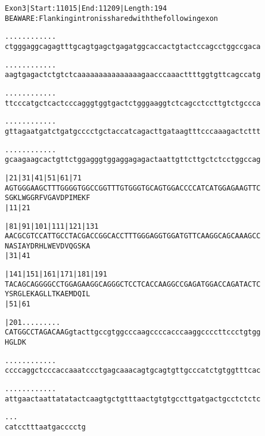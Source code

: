 \documentclass{article}
\begin{document}
\newpage
\begin{alltt}
Exon 3 | Start: 11015 | End: 11209 | Length: 194
BE AWARE: Flanking intron is shared with the following exon

.    .    .    .    .    .    .    .    .    .    .    .    
ctgggaggcagagtttgcagtgagctgagatggcaccactgtactccagcctggccgaca

.    .    .    .    .    .    .    .    .    .    .    .    
aagtgagactctgtctcaaaaaaaaaaaaaaagaacccaaacttttggtgttcagccatg

.    .    .    .    .    .    .    .    .    .    .    .    
ttcccatgctcactcccagggtggtgactctgggaaggtctcagcctccttgtctgccca

.    .    .    .    .    .    .    .    .    .    .    .    
gttagaatgatctgatgcccctgctaccatcagacttgataagtttcccaaagactcttt

.    .    .    .    .    .    .    .    .    .    .    .    
gcaagaagcactgttctggagggtggaggagagactaattgttcttgctctcctggccag

        |21       |31       |41       |51       |61       |71
AGTGGGAAGCTTTGGGGTGGCCGGTTTGTGGGTGCAGTGGACCCCATCATGGAGAAGTTC
S  G  K  L  W  G  G  R  F  V  G  A  V  D  P  I  M  E  K  F  
                  |11                           |21         

        |81       |91       |101      |111      |121      |131
AACGCGTCCATTGCCTACGACCGGCACCTTTGGGAGGTGGATGTTCAAGGCAGCAAAGCC
N  A  S  I  A  Y  D  R  H  L  W  E  V  D  V  Q  G  S  K  A  
                  |31                           |41         

        |141      |151      |161      |171      |181      |191
TACAGCAGGGGCCTGGAGAAGGCAGGGCTCCTCACCAAGGCCGAGATGGACCAGATACTC
Y  S  R  G  L  E  K  A  G  L  L  T  K  A  E  M  D  Q  I  L  
                  |51                           |61         

        |201       .    .    .    .    .    .    .    .    .
CATGGCCTAGACAAGgtacttgccgtggcccaagccccacccaaggccccttccctgtgg
H  G  L  D  K                                               

    .    .    .    .    .    .    .    .    .    .    .    .
ccccaggctcccaccaaatccctgagcaaacagtgcagtgttgcccatctgtggtttcac

    .    .    .    .    .    .    .    .    .    .    .    .
attgaactaattatatactcaagtgctgtttaactgtgtgccttgatgactgcctctctc

    .    .    .    
catcctttaatgacccctg
\end{alltt}
\newpage
\end{document}
